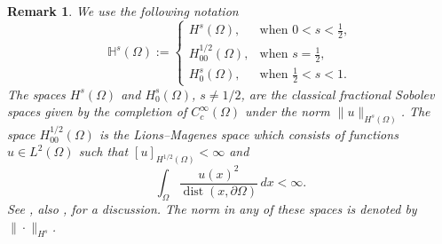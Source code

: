 \documentclass[a4paper,11pt]{amsart}
\newtheorem{remark}{Remark}
\theoremstyle{definition}
\def\O{\Omega}
\numberwithin{equation}{section}
\theoremstyle{definition}
\def\O{\Omega}
\begin{document}
\begin{remark}\label{remark1}
We use the following notation
\[
\mathbb{H}^s(\Omega) :=
\begin{cases}
H^s(\Omega), & \text{when } 0 < s < \tfrac{1}{2}, \\
H^{1/2}_{00}(\Omega), & \text{when } s = \tfrac{1}{2}, \\
H^s_0(\Omega), & \text{when } \tfrac{1}{2} < s < 1.
\end{cases} 
\]
The spaces $H^s(\Omega)$ and $H^s_0(\Omega)$, $s \neq 1/2$, are the classical fractional Sobolev spaces given by the completion of $C_c^\infty(\Omega)$ under the norm $\|u\|_{H^s(\Omega)}$. The space $H^{1/2}_{00}(\Omega)$ is the Lions--Magenes space which consists of functions $u \in L^2(\Omega)$ such that $[u]_{H^{1/2}(\Omega)} < \infty$ and
\[
\int_\Omega \frac{u(x)^2}{\operatorname{dist}(x, \partial \Omega)} \, dx < \infty.
\]
See \cite[Chapter 1]{lions_pro_1968}, also \cite[Section 2]{nochetto_a_2015},  for a discussion. The norm in any of these spaces is denoted by $\|\cdot\|_{H^s}$. 


\end{remark}




















%
%
\end{document}

